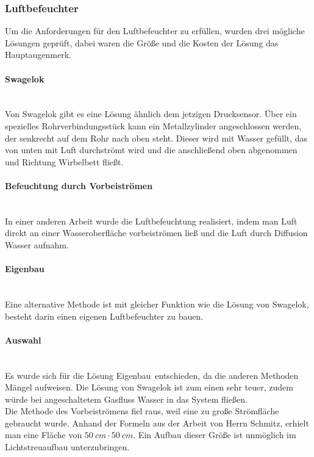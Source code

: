 \subsubsection{Luftbefeuchter}

Um die Anforderungen für den Luftbefeuchter zu erfüllen, wurden drei mögliche Lösungen geprüft, dabei waren die Größe und die Kosten der Lösung das Hauptaugenmerk.

\paragraph{Swagelok} 

\hfill \\

Von Swagelok gibt es eine Lösung ähnlich dem jetzigen Drucksensor. Über ein spezielles Rohrverbindungsstück kann ein Metallzylinder angeschlossen werden, der senkrecht auf dem Rohr nach oben steht. Dieser wird mit Wasser gefüllt, das von unten mit Luft durchströmt wird und die anschließend oben abgenommen und Richtung Wirbelbett fließt.

\paragraph{Befeuchtung durch Vorbeiströmen}

\hfill \\

In einer anderen Arbeit \cite{Fallturmexperiment} wurde die Luftbefeuchtung realisiert, indem man Luft direkt an einer  Wasseroberfläche vorbeiströmen ließ und die Luft durch Diffusion Wasser aufnahm. 

\paragraph{Eigenbau}
\hfill \\

Eine alternative Methode ist mit gleicher Funktion wie die Lösung von Swagelok, besteht darin einen eigenen Luftbefeuchter zu bauen. 


\paragraph{Auswahl}

\hfill \\

Es wurde sich für die Lösung \glqq Eigenbau\grqq \ entschieden, da die anderen Methoden Mängel aufweisen. Die Lösung von Swagelok ist zum einen sehr teuer, zudem würde bei angeschaltetem Gasfluss Wasser in das System fließen. \\
Die Methode des Vorbeiströmens fiel raus, weil eine zu große Strömfläche gebraucht wurde. Anhand der Formeln aus der Arbeit von Herrn Schmitz, erhielt man eine Fläche von $\SI{50}{cm} \cdot \SI{50}{cm}$. Ein Aufbau dieser Größe ist unmöglich im Lichtstreuaufbau unterzubringen.

